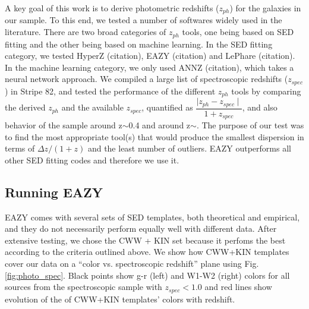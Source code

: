 \documentclass[apj,iop]{emulateapj}
\begin{document}
A key goal of this work is to derive photometric redshifts ($ z_{ph} $) for the galaxies in our sample. To this end, we tested a number of softwares widely used in the literature. There are two broad categories of $z_{ph}$ tools, one being based on SED fitting and the other being based on machine learning. In the SED fitting category, we tested HyperZ (citation), EAZY (citation) and LePhare (citation). In the machine learning category, we only used ANNZ (citation), which takes a neural network approach. We compiled a large list of spectroscopic redshifts ($z_{spec}$) in Stripe 82, and tested the performance of the different $z_{ph}$ tools by comparing the derived $z_{ph}$ and the available $z_{spec}$, quantified as $\dfrac{\mid z_{ph}-z_{spec}\mid}{1+z_{spec}}$, and also behavior of the sample around z$\sim$0.4 and around z$\sim$. The purpose of our test was to find the most appropriate tool(s) that would produce the smallest dispersion in terms of $\Delta z/(1+z)$ and the least number of outliers. EAZY outperforms all other SED fitting codes and therefore we use it.

\subsection{Running EAZY}

EAZY comes with several sets of SED templates, both theoretical and empirical, and they do not necessarily perform equally well with different data. %
After extensive testing, we chose the CWW + KIN set \citep[][]{Coleman1980, Kinney1996} because it perfoms the best according to the criteria outlined above. We show how CWW+KIN templates cover our data on a ``color vs. spectroscopic redshift'' plane using Fig. \ref{fig:photo_spec}. Black points show g-r (left) and W1-W2 (right) colors for all sources from the spectroscopic sample with $z_{spec}<1.0$ and red lines show evolution of the of CWW+KIN templates' colors with redshift.
\end{document}
